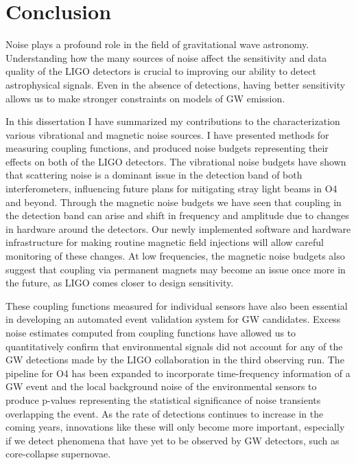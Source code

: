 \chapter{Conclusion}\label{ch:conclusion}

Noise plays a profound role in the field of gravitational wave astronomy.
Understanding how the many sources of noise affect the sensitivity and data quality of the LIGO detectors is crucial to improving our ability to detect astrophysical signals.
Even in the absence of detections, having better sensitivity allows us to make stronger constraints on models of GW emission.

In this dissertation I have summarized my contributions to the characterization various vibrational and magnetic noise sources.
I have presented methods for measuring coupling functions, and produced noise budgets representing their effects on both of the LIGO detectors.
The vibrational noise budgets have shown that scattering noise is a dominant issue in the detection band of both interferometers, influencing future plans for mitigating stray light beams in O4 and beyond.
Through the magnetic noise budgets we have seen that coupling in the detection band can arise and shift in frequency and amplitude due to changes in hardware around the detectors.
Our newly implemented software and hardware infrastructure for making routine magnetic field injections will allow careful monitoring of these changes.
At low frequencies, the magnetic noise budgets also suggest that coupling via permanent magnets may become an issue once more in the future, as LIGO comes closer to design sensitivity.

These coupling functions measured for individual sensors have also been essential in developing an automated event validation system for GW candidates.
Excess noise estimates computed from coupling functions have allowed us to quantitatively confirm that environmental signals did not account for any of the GW detections made by the LIGO collaboration in the third observing run.
The pipeline for O4 has been expanded to incorporate time-frequency information of a GW event and the local background noise of the environmental sensors to produce p-values representing the statistical significance of noise transients overlapping the event.
As the rate of detections continues to increase in the coming years, innovations like these will only become more important, especially if we detect phenomena that have yet to be observed by GW detectors, such as core-collapse supernovae.

